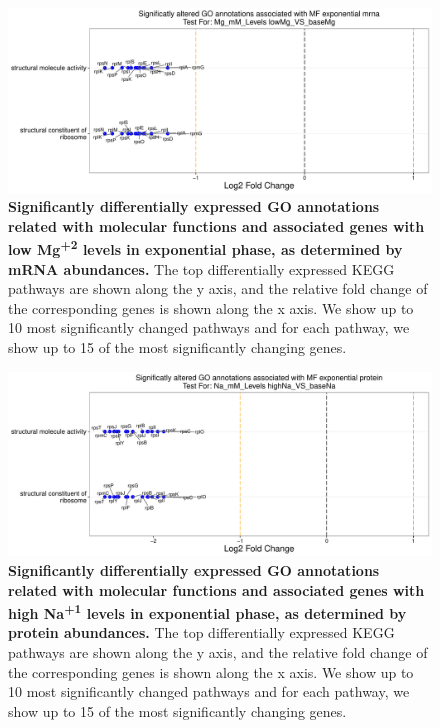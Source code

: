 \documentclass[a4paper]{article}
\begin{document}
\clearpage
\begin{figure}
	\includegraphics[width=1.0\textwidth]{../../d_figures/mf_n_03.pdf}
	\caption[Significantly altered GO annotations associated with molecular functions for mRNA samples in exponential phase tested for low Mg\textsuperscript{+2} against base Mg\textsuperscript{+2}]
	{\textbf{Significantly differentially expressed GO annotations related with molecular functions and associated genes with low Mg\textsuperscript{+2} levels in exponential phase, as determined by mRNA abundances.} The top differentially expressed KEGG pathways are shown along the y axis, and the relative fold change of the corresponding genes is shown along the x axis. We show up to 10 most significantly changed pathways and for each pathway, we show up to 15 of the most significantly changing genes.}
\end{figure}

\clearpage
\begin{figure}
	\includegraphics[width=1.0\textwidth]{../../d_figures/mf_n_04.pdf}
	\caption[Significantly altered GO annotations associated with molecular functions for protein samples in exponential phase tested for high Na\textsuperscript{+1} against base Na\textsuperscript{+1}]
	{\textbf{Significantly differentially expressed GO annotations related with molecular functions and associated genes with high Na\textsuperscript{+1} levels in exponential phase, as determined by protein abundances.} The top differentially expressed KEGG pathways are shown along the y axis, and the relative fold change of the corresponding genes is shown along the x axis. We show up to 10 most significantly changed pathways and for each pathway, we show up to 15 of the most significantly changing genes.}
\end{figure}
\end{document}
